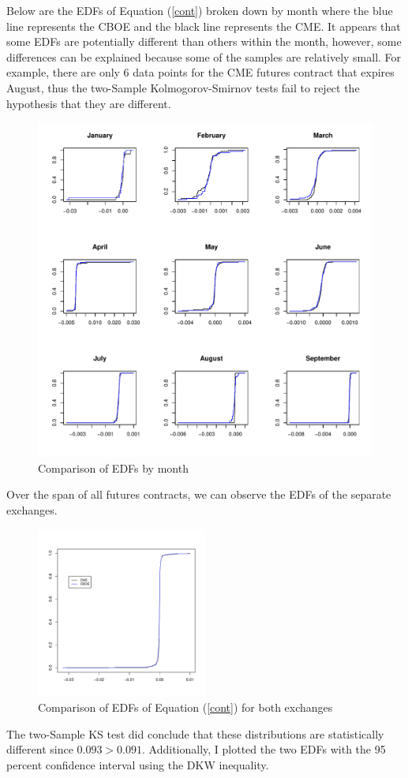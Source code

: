 \documentclass{paper}
\let\oldref\ref
\renewcommand{\ref}[1]{(\oldref{#1})}
\begin{document}
\begin{doublespacing}
Below are the EDFs of Equation \ref{cont} broken down by month where the blue line represents the CBOE and the black line represents the CME. It appears that some EDFs are potentially different than others within the month, however, some differences can be explained because some of the samples are relatively small. For example, there are only 6 data points for the CME futures contract that expires August, thus the two-Sample Kolmogorov-Smirnov tests fail to reject the hypothesis that they are different.
\begin{figure}[H]
\centering
\includegraphics{CMEvsCBOEperMonth.pdf}
\caption{Comparison of EDFs by month}\label{comparison}
\end{figure}
Over the span of all futures contracts, we can observe the EDFs of the separate exchanges.
\begin{figure}[H]
\centering
\includegraphics[width=0.5\textwidth]{Overall.pdf}
\caption{Comparison of EDFs of Equation \ref{cont} for both exchanges}\label{overall}
\end{figure}
The two-Sample KS test did conclude that these distributions are statistically different since $0.093 > 0.091$. Additionally, I plotted the two EDFs with the 95 percent confidence interval using the DKW inequality.


\end{doublespacing}
\end{document}

